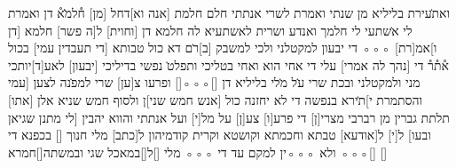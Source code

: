 \begin{aramaictext}
    ואת̇עירת בליליא מן שנתי ואמרת לשרי אנתתי חלם 
    חלמת [אנה וא]דחל [מן] ח֯למ̇̇א֯ דן ואמרת לי א̇שתעי לי חלמך ואנדע ושרית 
    לאשתעיא לה חלמא דן
    [וחוית] ל[ה פשר] חלמא [דן ו]אמ[רת] ◦◦◦ די יבעון למקטלני ולכי למשבק
    [ב]ר̇ם דא כול טבותא
    [די תעבדין עמי] בכול א֯ת֯ר֯ די [נהך לה אמרי] עלי די אחי הוא ואחי בטליכי
    ותפלט̇ נפשי בדיליכי
    [\hspace*{1.5em}יבעון] לאע[ד]יותכי מני ולמקטלני ובכת שרי ע̇ל מ̇לי בליליא דן
    [\hspace*{1.5em}]◦◦◦[\hspace{8em}] ופרעו צ[ען\hspace*{1.5em}] שרי למפ̇נה לצען
    [עמי והסתמרת י]ת̇ירא בנפשה די לא יחזנה כול [אנש חמש שני]ן ולסוף
    חמש שניא אלן
    [\hspace*{1.5em}אתו] תלתת גברין מן רברבי מצרי[ן\hspace*{0.75em}] די פרע[ו] צע[ן] על מל[י] ועל
    אנתתי והווא יהבין
    [לי מתנן שגיאן ובעו] ל[י] ל[אודעא] טבתא וחכמתא וקושטא וקרית קודמיהון
    ל[כתב] מלי חנוך
    [\hspace{8em}] בכפנא די [\hspace*{1.5em}]◦◦◦ ולא ◦◦◦ין למקם עד די ◦◦◦ מלי
    [\hspace{2em}]ל[\hspace*{1.5em}]במאכל שגי ובמשתה[\hspace{8em}]חמרא
    \hspace*{1.5em} 
    [\hspace{3em}]
\end{aramaictext}

